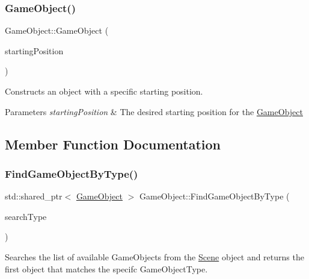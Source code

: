 \subsubsection{\texorpdfstring{Game\+Object()}{GameObject()}\hspace{0.1cm}{\footnotesize\ttfamily [3/3]}}
{\footnotesize\ttfamily Game\+Object\+::\+Game\+Object (\begin{DoxyParamCaption}\item[{const \hyperlink{class_vector2_d}{Vector2D} \&}]{starting\+Position }\end{DoxyParamCaption})}



Constructs an object with a specific starting position. 


\begin{DoxyParams}{Parameters}
{\em starting\+Position} & The desired starting position for the \hyperlink{class_game_object}{Game\+Object} \\
\hline
\end{DoxyParams}


\subsection{Member Function Documentation}
\mbox{\label{class_game_object_ac52291835ad2f3f36363589af0d3ae84}} 
\subsubsection{\texorpdfstring{Find\+Game\+Object\+By\+Type()}{FindGameObjectByType()}}
{\footnotesize\ttfamily std\+::shared\+\_\+ptr$<$ \hyperlink{class_game_object}{Game\+Object} $>$ Game\+Object\+::\+Find\+Game\+Object\+By\+Type (\begin{DoxyParamCaption}\item[{Game\+Object\+Type}]{search\+Type }\end{DoxyParamCaption})\hspace{0.3cm}{\ttfamily [protected]}}



Searches the list of available Game\+Objects from the \hyperlink{class_scene}{Scene} object and returns the first object that matches the specifc Game\+Object\+Type. 


